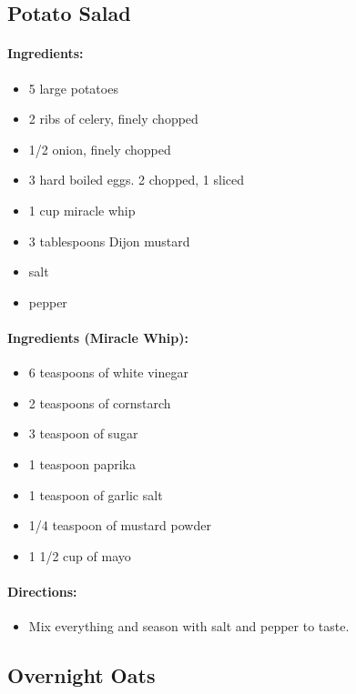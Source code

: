 \documentclass{article}
\begin{document}
\subsection{Potato Salad}

\paragraph{Ingredients:}

\begin{itemize}
	\item 5 large potatoes 
	\item 2 ribs of celery, finely chopped 
	\item 1/2 onion, finely chopped 
	\item 3 hard boiled eggs. 2 chopped, 1 sliced 
	\item 1 cup miracle whip 
	\item 3 tablespoons Dijon mustard 
	\item salt 
	\item pepper
\end{itemize}

\paragraph{Ingredients (Miracle Whip):}

\begin{itemize}
	\item 6 teaspoons of white vinegar 
	\item 2 teaspoons of cornstarch 
	\item 3 teaspoon of sugar 
	\item 1 teaspoon paprika 
	\item 1 teaspoon of garlic salt 
	\item 1/4 teaspoon of mustard powder 
	\item 1 1/2 cup of mayo
\end{itemize}

\paragraph{Directions:}
\begin{itemize}
	\item Mix everything and season with salt and pepper to taste.
\end{itemize}

\subsection{Overnight Oats}
\end{document}
